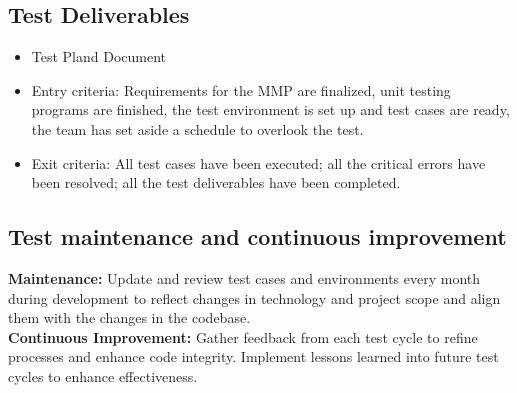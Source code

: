 \subsection{Test Deliverables}
\begin{itemize}
    \item Test Pland Document
    \item Entry criteria: Requirements for the MMP are finalized, unit testing programs are finished, the test environment is set up and test cases are ready, the team has set aside a schedule to overlook the test.
    \item Exit criteria: All test cases have been executed; all the critical errors have been resolved; all the test deliverables have been completed.
\end{itemize}

\subsection{Test maintenance and continuous improvement}
\textbf{Maintenance:} Update and review test cases and environments every month during development to reflect changes in technology and project scope and align them with the changes in the codebase.\\
\textbf{Continuous Improvement:} Gather feedback from each test cycle to refine processes and enhance code integrity. Implement lessons learned into future test cycles to enhance effectiveness. \\






